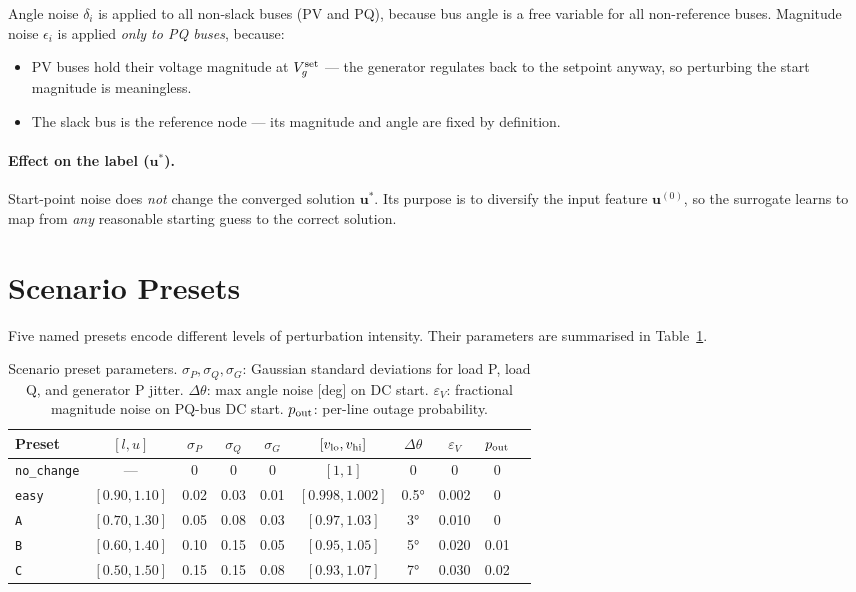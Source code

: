 \documentclass{article}
\begin{document}
Angle noise $\delta_i$ is applied to all non-slack buses (PV and PQ), because
bus angle is a free variable for all non-reference buses.
Magnitude noise $\epsilon_i$ is applied \emph{only to PQ buses}, because:
\begin{itemize}[noitemsep]
  \item PV buses hold their voltage magnitude at $V^{\rm set}_g$ --- the generator
        regulates back to the setpoint anyway, so perturbing the start magnitude
        is meaningless.
  \item The slack bus is the reference node --- its magnitude and angle are fixed
        by definition.
\end{itemize}

\paragraph{Effect on the label ($\mathbf{u}^*$).}
Start-point noise does \emph{not} change the converged solution
$\mathbf{u}^*$.  Its purpose is to diversify the input feature
$\mathbf{u}^{(0)}$, so the surrogate learns to map from
\emph{any} reasonable starting guess to the correct solution.

\section{Scenario Presets}

Five named presets encode different levels of perturbation intensity.  Their
parameters are summarised in Table~\ref{tab:presets}.

\begin{table}[h]
\centering
\caption{Scenario preset parameters.  $\sigma_P, \sigma_Q, \sigma_G$: Gaussian
  standard deviations for load P, load Q, and generator P jitter.
  $\Delta\theta$: max angle noise [deg] on DC start.
  $\varepsilon_V$: fractional magnitude noise on PQ-bus DC start.
  $p_{\rm out}$: per-line outage probability.}
\label{tab:presets}
\renewcommand{\arraystretch}{1.25}
\begin{tabular}{lccccccccc}
\toprule
Preset & $[l,u]$ & $\sigma_P$ & $\sigma_Q$ & $\sigma_G$
       & $[v_{\rm lo}, v_{\rm hi}]$
       & $\Delta\theta$ & $\varepsilon_V$ & $p_{\rm out}$ \\
\midrule
\texttt{no\_change}
  & ---          & 0     & 0     & 0     & $[1,1]$
  & 0           & 0      & 0 \\
\texttt{easy}
  & $[0.90, 1.10]$ & 0.02  & 0.03  & 0.01  & $[0.998, 1.002]$
  & 0.5°        & 0.002  & 0 \\
\texttt{A}
  & $[0.70, 1.30]$ & 0.05  & 0.08  & 0.03  & $[0.97, 1.03]$
  & 3°          & 0.010  & 0 \\
\texttt{B}
  & $[0.60, 1.40]$ & 0.10  & 0.15  & 0.05  & $[0.95, 1.05]$
  & 5°          & 0.020  & 0.01 \\
\texttt{C}
  & $[0.50, 1.50]$ & 0.15  & 0.15  & 0.08  & $[0.93, 1.07]$
  & 7°          & 0.030  & 0.02 \\
\bottomrule
\end{tabular}
\end{table}
\end{document}
